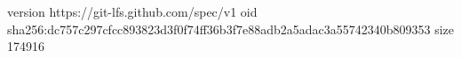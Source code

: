version https://git-lfs.github.com/spec/v1
oid sha256:dc757c297cfcc893823d3f0f74ff36b3f7e88adb2a5adac3a55742340b809353
size 174916
